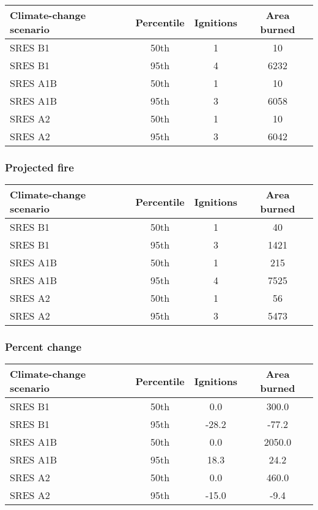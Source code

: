 \documentclass{article}\usepackage[]{graphicx}\usepackage[]{color}
\newcommand{\headcol}{\rowcolor{tableheadcolor}}
\begin{document}
\begin{table}[ht]
\centering
\begin{tabular}{lccc}
  \headcol 
 \toprule
Climate-change scenario & Percentile & Ignitions & Area burned \\ 
  \midrule
SRES B1 & 50th & 1 & 10 \\ 
  SRES B1 & 95th & 4 & 6232 \\ 
  SRES A1B & 50th & 1 & 10 \\ 
  SRES A1B & 95th & 3 & 6058 \\ 
  SRES A2 & 50th & 1 & 10 \\ 
  SRES A2 & 95th & 3 & 6042 \\ 
   \bottomrule
\end{tabular}
\end{table}


\subsubsection{Projected fire}

\begin{table}[ht]
\centering
\begin{tabular}{lccc}
  \headcol 
 \toprule
Climate-change scenario & Percentile & Ignitions & Area burned \\ 
  \midrule
SRES B1 & 50th & 1 & 40 \\ 
  SRES B1 & 95th & 3 & 1421 \\ 
  SRES A1B & 50th & 1 & 215 \\ 
  SRES A1B & 95th & 4 & 7525 \\ 
  SRES A2 & 50th & 1 & 56 \\ 
  SRES A2 & 95th & 3 & 5473 \\ 
   \bottomrule
\end{tabular}
\end{table}


\subsubsection{Percent change}

\begin{table}[ht]
\centering
\begin{tabular}{lccc}
  \headcol 
 \toprule
Climate-change scenario & Percentile & Ignitions & Area burned \\ 
  \midrule
SRES B1 & 50th & 0.0 & 300.0 \\ 
  SRES B1 & 95th & -28.2 & -77.2 \\ 
  SRES A1B & 50th & 0.0 & 2050.0 \\ 
  SRES A1B & 95th & 18.3 & 24.2 \\ 
  SRES A2 & 50th & 0.0 & 460.0 \\ 
  SRES A2 & 95th & -15.0 & -9.4 \\ 
   \bottomrule
\end{tabular}
\end{table}
\end{document}
